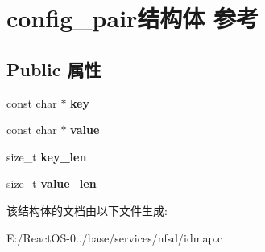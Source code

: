 \hypertarget{structconfig__pair}{}\section{config\+\_\+pair结构体 参考}
\label{structconfig__pair}
\subsection*{Public 属性}
\begin{DoxyCompactItemize}
\item 
\mbox{\label{structconfig__pair_a8da23de1ce20f8a0c892c95a8f978cf6}} 
const char $\ast$ {\bfseries key}
\item 
\mbox{\label{structconfig__pair_af6a17df503a976a74a59bcf02ce32fbe}} 
const char $\ast$ {\bfseries value}
\item 
\mbox{\label{structconfig__pair_a74bcfc6c4b11f665f61a80ce25727bcb}} 
size\+\_\+t {\bfseries key\+\_\+len}
\item 
\mbox{\label{structconfig__pair_ae8b9faeb4b275ed034eae66a866c238d}} 
size\+\_\+t {\bfseries value\+\_\+len}
\end{DoxyCompactItemize}


该结构体的文档由以下文件生成\+:\begin{DoxyCompactItemize}
\item 
E\+:/\+React\+O\+S-\/0../base/services/nfsd/idmap.\+c\end{DoxyCompactItemize}
